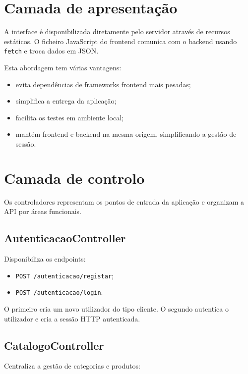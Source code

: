\documentclass[10pt,a4paper]{report}
\begin{document}
\section{Camada de apresentação}

A interface é disponibilizada diretamente pelo servidor através de recursos estáticos. O ficheiro JavaScript do frontend comunica com o backend usando \texttt{fetch} e troca dados em \ac{JSON}.

Esta abordagem tem várias vantagens:

\begin{itemize}
    \item evita dependências de frameworks frontend mais pesadas;
    \item simplifica a entrega da aplicação;
    \item facilita os testes em ambiente local;
    \item mantém frontend e backend na mesma origem, simplificando a gestão de sessão.
\end{itemize}

\section{Camada de controlo}

Os controladores representam os pontos de entrada da aplicação e organizam a \ac{API} por áreas funcionais.

\subsection{AutenticacaoController}

Disponibiliza os endpoints:

\begin{itemize}
    \item \texttt{POST /autenticacao/registar};
    \item \texttt{POST /autenticacao/login}.
\end{itemize}

O primeiro cria um novo utilizador do tipo cliente. O segundo autentica o utilizador e cria a sessão HTTP autenticada.

\subsection{CatalogoController}

Centraliza a gestão de categorias e produtos:
\end{document}
